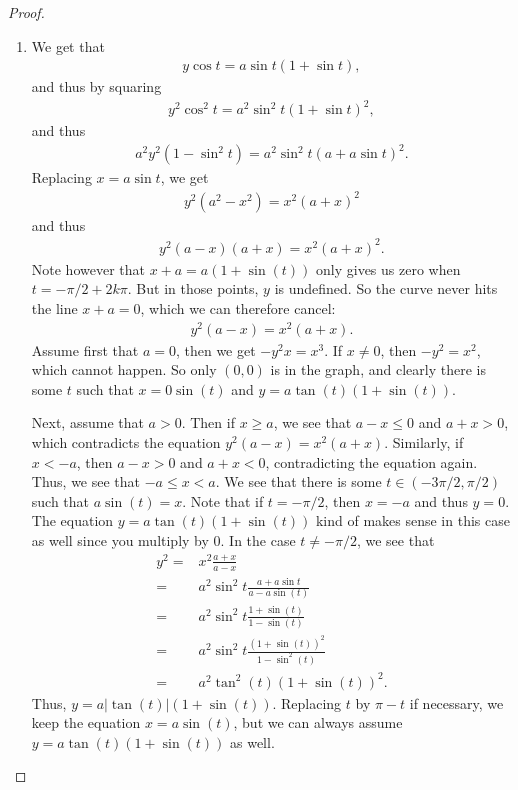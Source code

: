 \begin{proof}
    \begin{enumerate}
        \item We get that
        \begin{align*}
            y\cos t = a\sin t (1 + \sin t),
        \end{align*}
        and thus by squaring
        \begin{align*}
            y^2 \cos^2 t = a^2 \sin^2 t ( 1  + \sin t)^2,
        \end{align*}
        and thus
        \begin{align*}
            a^2 y^2 (1 - \sin^2 t) = a^2 \sin^2 t ( a + a\sin t)^2.
        \end{align*}
        Replacing $x=a\sin t$, we get
        \begin{align*}
            y^2 (a^2 - x^2) = x^2 (a + x)^2
        \end{align*}
        and thus
        \begin{align*}
            y^2 (a-x)(a+x) = x^2 (a+x)^2.
        \end{align*}
        Note however that $x+a = a(1 + \sin(t))$ only gives us zero when $t = -\pi/2 + 2k\pi$. 
        But in those points, $y$ is undefined. 
        So the curve never hits the line $x+a = 0$, which we can therefore cancel:
        \begin{align*}
            y^2 (a-x) = x^2 (a+x).
        \end{align*}
        Assume first that $a=0$, then we get $-y^2 x = x^3$. 
        If $x\neq 0$, then $-y^2 = x^2$, which cannot happen. 
        So only $(0,0)$ is in the graph, and clearly there is some $t$ such that $x=0\sin(t)$ and $y = a\tan(t) (1 + \sin(t))$.

        Next, assume that $a>0$. 
        Then if $x\geq a$, we see that $a-x\leq 0$ and $a+x>0$, which contradicts the equation $y^2 (a-x) = x^2 (a+x)$. 
        Similarly, if $x<-a$, then $a-x>0$ and $a+x<0$, contradicting the equation again. 
        Thus, we see that $-a\leq x<a$. We see that there is some $t\in (-3\pi/2,\pi/2)$ such that $a\sin(t) = x$. 
        Note that if $t=-\pi/2$, then $x=-a$ and thus $y=0$. 
        The equation $y = a\tan(t) (1+\sin(t))$ kind of makes sense in this case as well since you multiply by $0$. 
        In the case $t\neq -\pi/2$, we see that
        \begin{align*}
            y^2
            =& x^2\frac{a+x}{a-x}\\
            =& a^2 \sin^2 t \frac{a + a\sin t}{a - a\sin(t)}\\
            =& a^2 \sin^2 t \frac{1 + \sin(t)}{1 - \sin(t)}\\
            =& a^2 \sin^2 t \frac{(1 + \sin(t))^2}{1 - \sin^2(t)}\\
            =& a^2 \tan^2(t) (1 + \sin(t))^2.
        \end{align*}
        Thus, $y = a|\tan(t)|(1 + \sin(t))$. 
        Replacing $t$ by $\pi - t$ if necessary, we keep the equation $x = a\sin(t)$, but we can always assume $y = a\tan(t)(1+\sin(t))$ as well.


\end{enumerate}
\end{proof}
